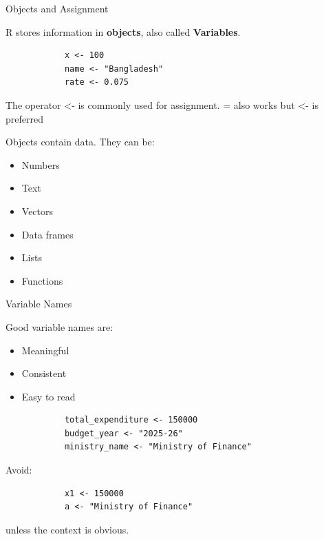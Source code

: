 \documentclass[aspectratio=169,11pt]{beamer}
\begin{document}
	
	\begin{frame}[fragile]{Objects and Assignment}
		
		R stores information in \textbf{objects}, also called \textbf{Variables}.
		
		\begin{lstlisting}
			x <- 100
			name <- "Bangladesh"
			rate <- 0.075
		\end{lstlisting}
		
		The operator \(\boxed{\texttt{<-}}\) is commonly used for assignment.
		\(\boxed{\texttt{=}}\) also works but \(\boxed{\texttt{<-}}\) is preferred
		
		\vspace{0.3cm}
		
		Objects contain data. They can be:
		
		\begin{itemize}
			\item Numbers
			\item Text
			\item Vectors
			\item Data frames
			\item Lists
			\item Functions
		\end{itemize}
		
	\end{frame}
	
	
	\begin{frame}[fragile]{Variable Names}
		
		Good variable names are:
		
		\begin{itemize}
			\item Meaningful
			\item Consistent
			\item Easy to read
		\end{itemize}
		
		\begin{lstlisting}
			total_expenditure <- 150000
			budget_year <- "2025-26"
			ministry_name <- "Ministry of Finance"
		\end{lstlisting}
		
		Avoid:
		
		\begin{lstlisting}
			x1 <- 150000
			a <- "Ministry of Finance"
		\end{lstlisting}
		
		unless the context is obvious.
		
	\end{frame}
	
\end{document}
